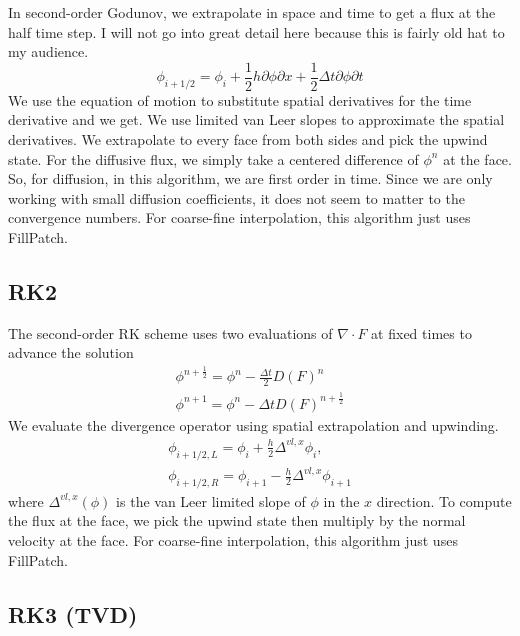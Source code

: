 \documentclass{article}
\newcommand{\dt}{{\Delta t}}
\newcommand{\dx}{{h}}
\newcommand{\nph}{{n + \frac{1}{2}}}
\newcommand{\half}{\frac{1}{2}}
\begin{document}
In second-order Godunov, we extrapolate in space and time to get a
flux at the half time step.   I will not go into great detail here
because this is fairly old hat to my audience.
$$
\phi_{i+1/2} = \phi_i + \half\dx \partial{\phi}{\partial x} + \half\dt \partial{\phi}{\partial t}
$$
We use the equation of motion to substitute spatial derivatives for
the time derivative and we get.   We use  limited van Leer slopes to
approximate the spatial derivatives.  We extrapolate to every face
from both sides and pick the upwind state.   For the diffusive flux,
we simply take a centered difference of $\phi^n$ at the face.  So, for
diffusion, in this algorithm, we are first order in time.   Since we
are only working with small diffusion coefficients, it does not seem
to matter to the convergence numbers.   For coarse-fine interpolation,
this algorithm just uses FillPatch.

\subsection{RK2}

The second-order RK scheme uses two evaluations of $\nabla \cdot F$ at
fixed times to advance the solution
$$
\begin{array}{l}
\phi^\nph = \phi^n -  \frac{\dt}{2} D(F)^n\\
\phi^{n+1} = \phi^n - \dt D(F)^\nph
\end{array}
$$
We evaluate the divergence operator using spatial extrapolation and
upwinding.
$$
\begin{array}{l}
\phi_{i+1/2, L} = \phi_i + \frac{\dx}{2} \Delta^{vl,x} \phi_i, \\
\phi_{i+1/2, R} = \phi_{i+1} - \frac{\dx}{2} \Delta^{vl,x} \phi_{i+1}
\end{array}
$$
where $\Delta^{vl,x}(\phi)$ is the van Leer limited slope of $\phi$ in
the $x$ direction.   To compute the flux at the face, we pick the
upwind state then multiply by the normal velocity at the face.   
 For coarse-fine interpolation,  this algorithm just uses FillPatch.

\subsection{RK3 (TVD)}
\end{document}
